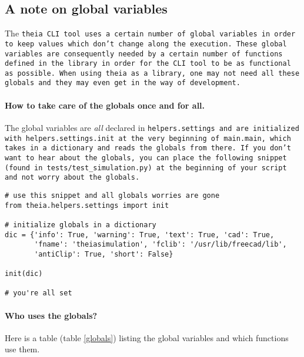 \documentclass{article}
\begin{document}
\subsection{A note on global variables}
The \tt{theia} CLI tool uses a certain number of global variables in order to keep values which don't change along the execution. These global variables are consequently needed by a certain number of functions defined in the library in order for the CLI tool to be as functional as possible. When using \tt{theia} as a library, one may not need all these globals and they may even get in the way of development.

\paragraph{How to take care of the globals once and for all.}The global variables are \textit{all} declared in \tt{helpers.settings} and are initialized with \tt{helpers.settings.init} at the very beginning of \tt{main.main}, which takes in a dictionary and reads the globals from there. If you don't want to hear about the globals, you can place the following snippet (found in \tt{tests/test\_simulation.py}) at the beginning of your script and not worry about the globals.

\begin{lstlisting}
# use this snippet and all globals worries are gone
from theia.helpers.settings import init

# initialize globals in a dictionary
dic = {'info': True, 'warning': True, 'text': True, 'cad': True,
       'fname': 'theiasimulation', 'fclib': '/usr/lib/freecad/lib',
       'antiClip': True, 'short': False}

init(dic)

# you're all set
\end{lstlisting}

\paragraph{Who uses the globals?}Here is a table (table \ref{globals}) listing the global variables and which functions use them.
\end{document}
